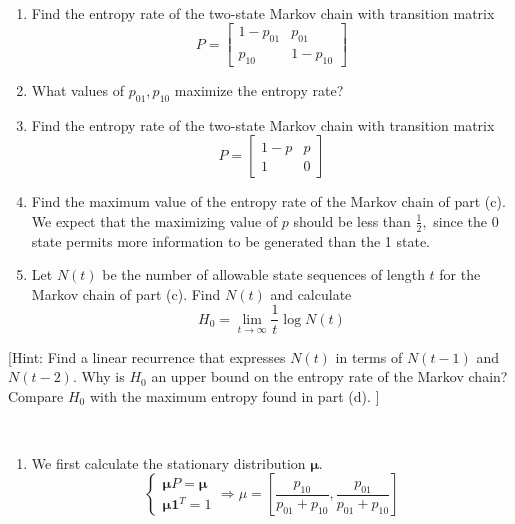 \begin{exercise}{ \par{~}
  \begin{enumerate}
    \item Find the entropy rate of the two-state Markov chain with transition matrix
    $$
    P=\left[\begin{array}{cc}
    1-p_{01} & p_{01} \\
    p_{10} & 1-p_{10}
    \end{array}\right]
    $$
    \item What values of $p_{01}, p_{10}$ maximize the entropy rate?
    \item Find the entropy rate of the two-state Markov chain with transition matrix
    $$
    P=\left[\begin{array}{cc}
    1-p & p \\
    1 & 0
    \end{array}\right]
    $$
    \item Find the maximum value of the entropy rate of the Markov chain of part (c). We expect that the maximizing value of $p$ should be less than $\frac{1}{2},$ since the 0 state permits more information to be generated than the 1 state.
    \item Let $N(t)$ be the number of allowable state sequences of length $t$ for the Markov chain of part (c). Find $N(t)$ and calculate
    $$
    H_{0}=\lim _{t \rightarrow \infty} \frac{1}{t} \log N(t)
    $$
  \end{enumerate}
  [Hint: Find a linear recurrence that expresses $N(t)$ in terms of $N(t-1)$ and $N(t-2) .$ Why is $H_{0}$ an upper bound on the entropy rate of the Markov chain? Compare $H_{0}$ with the maximum entropy found in part (d). $]$}
  \begin{solution}
  \par{~}
  \begin{enumerate}
    \item {
      We first calculate the stationary distribution $\mathbf{\mu}$.
      \begin{equation}
        \left\{\begin{array}{c}
          \mathbf{\mu}P = \mathbf{\mu} \\
          \mathbf{\mu} \mathbf{1}^T = 1
        \end{array}\right. \Rightarrow \mu = \left[\frac{p_{10}}{p_{01}+p_{10}}, \frac{p_{01}}{p_{01}+p_{10}}\right]

\end{equation}}
\end{enumerate}
\end{solution}
\end{exercise}
